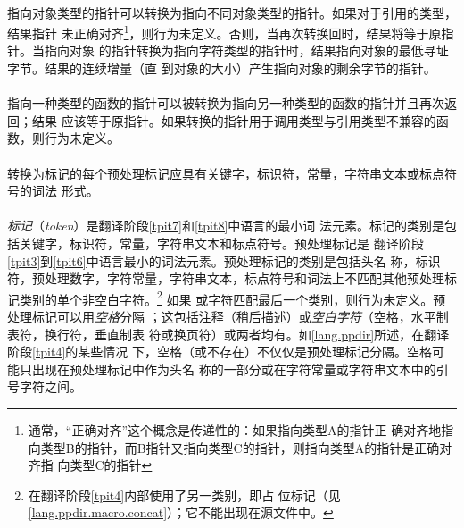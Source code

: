 {\paragraph{}
指向对象类型的指针可以转换为指向不同对象类型的指针。如果对于引用的类型，结果指针
未正确对齐\footnote{通常，``正确对齐''这个概念是传递性的：如果指向类型A的指针正
确对齐地指向类型B的指针，而B指针又指向类型C的指针，则指向类型A的指针是正确对齐指
向类型C的指针}，则行为未定义。否则，当再次转换回时，结果将等于原指针。当指向对象
的指针转换为指向字符类型的指针时，结果指向对象的最低寻址字节。结果的连续增量（直
到对象的大小）产生指向对象的剩余字节的指针。

\paragraph{}
指向一种类型的函数的指针可以被转换为指向另一种类型的函数的指针并且再次返回；结果
应该等于原指针。如果转换的指针用于调用类型与引用类型不兼容的函数，则行为未定义。


\syntax
\paragraph{}

\constraint
\paragraph{}
转换为标记的每个预处理标记应具有关键字，标识符，常量，字符串文本或标点符号的词法
形式。

\semantic
\paragraph{}
\textit{标记}（\textit{token}）是翻译阶段\ref{tpit7}和\ref{tpit8}中语言的最小词
法元素。标记的类别是包括关键字，标识符，常量，字符串文本和标点符号。预处理标记是
翻译阶段\ref{tpit3}到\ref{tpit6}中语言最小的词法元素。预处理标记的类别是包括头名
称，标识符，预处理数字，字符常量，字符串文本，标点符号和词法上不匹配其他预处理标
记类别的单个非空白字符。\footnote{在翻译阶段\ref{tpit4}内部使用了另一类别，即占
位标记（见\ref{lang.ppdir.macro.concat}）；它不能出现在源文件中。} 如果\tm{\sq}
或\tm{\dq}字符匹配最后一个类别，则行为未定义。预处理标记可以用\textit{空格}分隔
；这包括注释（稍后描述）或\textit{空白字符}（空格，水平制表符，换行符，垂直制表
符或换页符）或两者均有。如\ref{lang.ppdir}所述，在翻译阶段\ref{tpit4}的某些情况
下，空格（或不存在）不仅仅是预处理标记分隔。空格可能只出现在预处理标记中作为头名
称的一部分或在字符常量或字符串文本中的引号字符之间。

}
